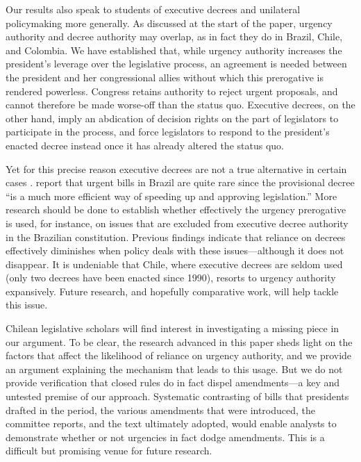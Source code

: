 \documentclass[letter,12pt]{article}
\begin{document}
Our results also speak to students of executive decrees and unilateral policymaking more generally. As discussed at the start of the paper, urgency authority and decree authority may overlap, as in fact they do in Brazil, Chile, and Colombia. We have established that, while urgency authority increases the president's leverage over the legislative process, an agreement is needed between the president and her congressional allies without which this prerogative is rendered powerless. Congress retains authority to reject urgent proposals, and cannot therefore be made worse-off than the status quo. Executive decrees, on the other hand, imply an abdication of decision rights on the part of legislators to participate in the process, and force legislators to respond to the president's enacted decree instead once it has already altered the status quo.

Yet for this precise reason executive decrees are not a true alternative in certain cases \citep{palanza.2019}. \citet[][, 164]{figueiredo.limongi.2000} report that urgent bills in Brazil are quite rare since the provisional decree ``is a much more efficient way of speeding up and approving legislation.'' More research should be done to establish whether effectively the urgency prerogative is used, for instance, on issues that are excluded from executive decree authority in the Brazilian constitution. Previous findings indicate that reliance on decrees effectively diminishes when policy deals with these issues---although it does not disappear. It is undeniable that Chile, where executive decrees are seldom used (only two decrees have been enacted since 1990), resorts to urgency authority expansively. Future research, and hopefully comparative work, will help tackle this issue. 

Chilean legislative scholars will find interest in investigating a missing piece in our argument. To be clear, the research advanced in this paper sheds light on the factors that affect the likelihood of reliance on urgency authority, and we provide an argument explaining the mechanism that leads to this usage. But we do not provide verification that closed rules do in fact dispel amendments---a key and untested premise of our approach. Systematic contrasting of bills that presidents drafted in the period, the various amendments that were introduced, the committee reports, and the text ultimately adopted, would enable analysts to demonstrate whether or not urgencies in fact dodge amendments. This is a difficult but promising venue for future research. 
\end{document}
